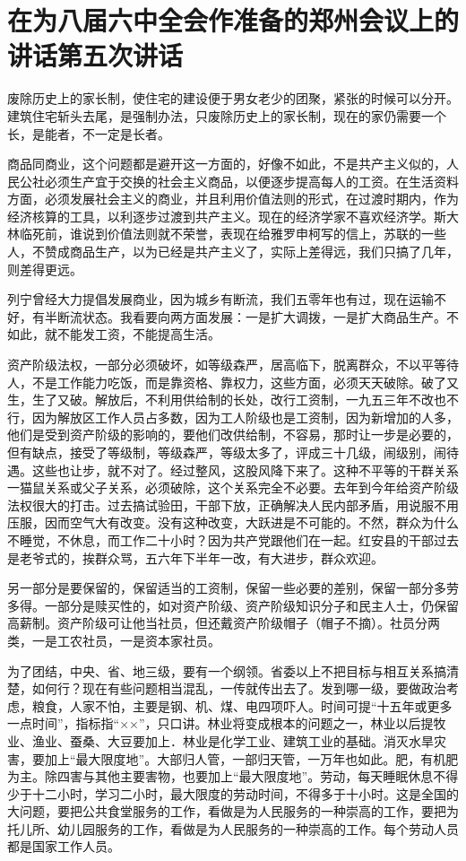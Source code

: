 \section[在为八届六中全会作准备的郑州会议上的讲话第五次讲话（一九五八年十一月九日）]{在为八届六中全会作准备的郑州会议上的讲话第五次讲话}


废除历史上的家长制，使住宅的建设便于男女老少的团聚，紧张的时候可以分开。建筑住宅斩头去尾，是强制办法，只废除历史上的家长制，现在的家仍需要一个长，是能者，不一定是长者。

商品同商业，这个问题都是避开这一方面的，好像不如此，不是共产主义似的，人民公社必须生产宜于交换的社会主义商品，以便逐步提高每人的工资。在生活资料方面，必须发展社会主义的商业，并且利用价值法则的形式，在过渡时期内，作为经济核算的工具，以利逐步过渡到共产主义。现在的经济学家不喜欢经济学。斯大林临死前，谁说到价值法则就不荣誉，表现在给雅罗申柯写的信上，苏联的一些人，不赞成商品生产，以为已经是共产主义了，实际上差得远，我们只搞了几年，则差得更远。

列宁曾经大力提倡发展商业，因为城乡有断流，我们五零年也有过，现在运输不好，有半断流状态。我看要向两方面发展：一是扩大调拨，一是扩大商品生产。不如此，就不能发工资，不能提高生活。

资产阶级法权，一部分必须破坏，如等级森严，居高临下，脱离群众，不以平等待人，不是工作能力吃饭，而是靠资格、靠权力，这些方面，必须天天破除。破了又生，生了又破。解放后，不利用供给制的长处，改行工资制，一九五三年不改也不行，因为解放区工作人员占多数，因为工人阶级也是工资制，因为新增加的人多，他们是受到资产阶级的影响的，要他们改供给制，不容易，那时让一步是必要的，但有缺点，接受了等级制，等级森严，等级太多了，评成三十几级，闹级别，闹待遇。这些也让步，就不对了。经过整风，这股风降下来了。这种不平等的干群关系一猫鼠关系或父子关系，必须破除，这个关系完全不必要。去年到今年给资产阶级法权很大的打击。过去搞试验田，干部下放，正确解决人民内部矛盾，用说服不用压服，因而空气大有改变。没有这种改变，大跃进是不可能的。不然，群众为什么不睡觉，不休息，而工作二十小时？因为共产党跟他们在一起。红安县的干部过去是老爷式的，挨群众骂，五六年下半年一改，有大进步，群众欢迎。

另一部分是要保留的，保留适当的工资制，保留一些必要的差别，保留一部分多劳多得。一部分是赎买性的，如对资产阶级、资产阶级知识分子和民主人士，仍保留高薪制。资产阶级可让他当社员，但还戴资产阶级帽子（帽子不摘）。社员分两类，一是工农社员，一是资本家社员。

为了团结，中央、省、地三级，要有一个纲领。省委以上不把目标与相互关系搞清楚，如何行？现在有些问题相当混乱，一传就传出去了。发到哪一级，要做政治考虑，粮食，人家不怕，主要是钢、机、煤、电四项吓人。时间可提“十五年或更多一点时间”，指标指“××”，只口讲。林业将变成根本的问题之一，林业以后提牧业、渔业、蚕桑、大豆要加上．林业是化学工业、建筑工业的基础。消灭水旱灾害，要加上“最大限度地”。大部归人管，一部归天管，一万年也如此。肥，有机肥为主。除四害与其他主要害物，也要加上“最大限度地”。劳动，每天睡眠休息不得少于十二小时，学习二小时，最大限度的劳动时间，不得多于十小时。这是全国的大问题，要把公共食堂服务的工作，看做是为人民服务的一种崇高的工作，要把为托儿所、幼儿园服务的工作，看做是为人民服务的一种崇高的工作。每个劳动人员都是国家工作人员。


